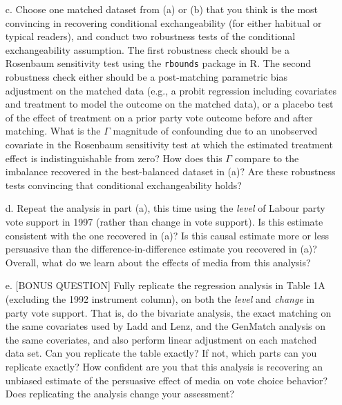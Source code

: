 \documentclass{article}
\begin{document}
\begin{itemize}
\item[c.] Choose one matched dataset from (a) or (b) that you think is
  the most convincing in recovering conditional exchangeability (for
  either habitual or typical readers), and conduct two robustness
  tests of the conditional exchangeability assumption.  The first
  robustness check should be a Rosenbaum sensitivity test using the
  \texttt{rbounds} package in {R}.  The second robustness check either
  should be a post-matching parametric bias adjustment on the matched
  data (e.g., a probit regression including covariates and treatment
  to model the outcome on the matched data), or a placebo test of the
  effect of treatment on a prior party vote outcome before and after
  matching.  What is the $\Gamma$ magnitude of confounding due to an
  unobserved covariate in the Rosenbaum sensitivity test at which the
  estimated treatment effect is indistinguishable from zero?  How does
  this $\Gamma$ compare to the imbalance recovered in the
  best-balanced dataset in (a)?  Are these robustness tests convincing
  that conditional exchangeability holds?


\item[d.] Repeat the analysis in part (a), this time using the {\em
    level} of Labour party vote support in 1997 (rather than change in
  vote support). Is this estimate consistent with the one recovered in
  (a)?  Is this causal estimate more or less persuasive than the
  difference-in-difference estimate you recovered in (a)?   Overall, what do we learn about the effects of media from this
  analysis?  






\item[e.] [BONUS QUESTION] Fully replicate the regression analysis in
  Table 1A (excluding the 1992 instrument column), on both the {\em
    level} and {\em change} in party vote support.  That is, do the
  bivariate analysis, the exact matching on the same covariates used
  by Ladd and Lenz, and the GenMatch analysis on the same coveriates,
  and also perform linear adjustment on each matched data set.  Can
  you replicate the table exactly? If not, which parts can you
  replicate exactly? How confident are you that this analysis is
  recovering an unbiased estimate of the persuasive effect of media on
  vote choice behavior? Does replicating the analysis change your
  assessment?







\end{itemize}
\end{document}
